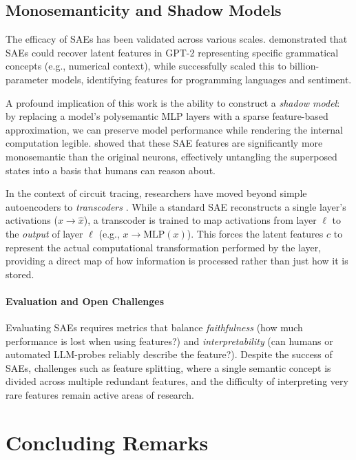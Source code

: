\subsection{Monosemanticity and Shadow Models}
The efficacy of SAEs has been validated across various scales. \citet{cunningham2023sparse} demonstrated that SAEs could recover latent features in GPT-2 representing specific grammatical concepts (e.g., numerical context), while \citet{gao2024scaling} successfully scaled this to billion-parameter models, identifying features for programming languages and sentiment.

A profound implication of this work is the ability to construct a \emph{shadow model}: by replacing a model's polysemantic MLP layers with a sparse feature-based approximation, we can preserve model performance while rendering the internal computation legible. \citet{bricken2023monosemanticity} showed that these SAE features are significantly more monosemantic than the original neurons, effectively untangling the superposed states into a basis that humans can reason about.

In the context of circuit tracing, researchers have moved beyond simple autoencoders to \emph{transcoders} \citep{dunefsky2024transcoders}. While a standard SAE reconstructs a single layer's activations ($x \rightarrow \hat{x}$), a transcoder is trained to map activations from layer $\ell$ to the \emph{output} of layer $\ell$ (e.g., $x \rightarrow \text{MLP}(x)$). This forces the latent features $c$ to represent the actual computational transformation performed by the layer, providing a direct map of how information is processed rather than just how it is stored.

\paragraph{Evaluation and Open Challenges}
Evaluating SAEs requires metrics that balance \emph{faithfulness} (how much performance is lost when using features?) and \emph{interpretability} (can humans or automated LLM-probes reliably describe the feature?). Despite the success of SAEs, challenges such as feature splitting, where a single semantic concept is divided across multiple redundant features, and the difficulty of interpreting very rare features remain active areas of research.

\section{Concluding Remarks}

